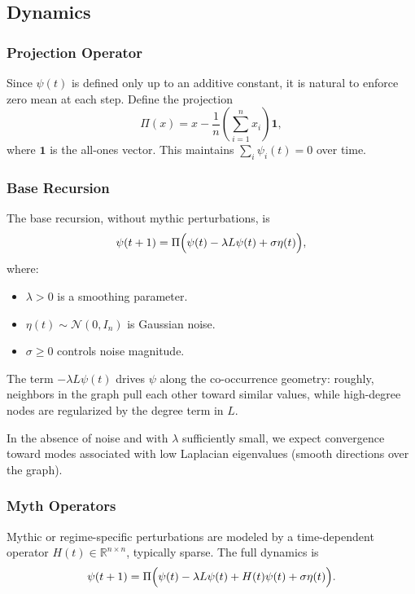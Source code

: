 \documentclass[11pt]{article}
\begin{document}
\subsection{Dynamics}

\subsubsection{Projection Operator}

Since \(\psi(t)\) is defined only up to an additive constant, it is
natural to enforce zero mean at each step. Define the projection
\[
\Pi(x) = x - \frac{1}{n}\left(\sum_{i=1}^n x_i\right)\mathbf{1},
\]
where \(\mathbf{1}\) is the all-ones vector. This maintains
\(\sum_i \psi_i(t) = 0\) over time.

\subsubsection{Base Recursion}

The base recursion, without mythic perturbations, is
\begin{equation}
\psi(t+1)
= \Pi\Bigl(
    \psi(t) - \lambda L\psi(t) + \sigma \eta(t)
  \Bigr),
\label{eq:base-dynamics}
\end{equation}
where:
\begin{itemize}[nosep]
  \item \(\lambda>0\) is a smoothing parameter.
  \item \(\eta(t)\sim \mathcal{N}(0, I_n)\) is Gaussian noise.
  \item \(\sigma\ge 0\) controls noise magnitude.
\end{itemize}

The term \(-\lambda L\psi(t)\) drives \(\psi\) along the co-occurrence
geometry: roughly, neighbors in the graph pull each other toward
similar values, while high-degree nodes are regularized by the degree
term in \(L\).

In the absence of noise and with \(\lambda\) sufficiently small, we
expect convergence toward modes associated with low Laplacian
eigenvalues (smooth directions over the graph).

\subsubsection{Myth Operators}

Mythic or regime-specific perturbations are modeled by a time-dependent
operator \(H(t)\in\mathbb{R}^{n\times n}\), typically sparse. The full
dynamics is
\begin{equation}
\psi(t+1)
= \Pi\Bigl(
    \psi(t) - \lambda L\psi(t) + H(t)\psi(t) + \sigma\eta(t)
  \Bigr).
\label{eq:full-dynamics}
\end{equation}
\end{document}
